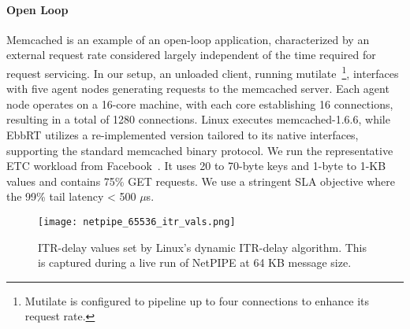 \paragraph*{Open Loop}
Memcached is an example of an open-loop application, characterized by an external request rate considered largely independent of the time required for request servicing. In our setup, an unloaded client, running mutilate~\cite{mutilate}\footnote{Mutilate is configured to pipeline up to four connections to enhance its request rate.}, interfaces with five agent nodes generating requests to the memcached server. Each agent node operates on a 16-core machine, with each core establishing 16 connections, resulting in a total of 1280 connections. Linux executes memcached-1.6.6, while EbbRT utilizes a re-implemented version tailored to its native interfaces, supporting the standard memcached binary protocol. We run the representative ETC workload from Facebook~\cite{workloadanalysisfacebook}. It uses 20 to 70-byte keys and 1-byte to 1-KB values and contains 75\% GET requests. We use a stringent SLA objective where the 99\% tail latency < 500 $\mu$s.\\


\begin{figure}[h!]
\centering
\texttt{[image: netpipe\_65536\_itr\_vals.png]}
\caption[]{\small ITR-delay values set by Linux's dynamic ITR-delay algorithm. This is captured during a live run of NetPIPE at 64 KB message size.}
\label{fig:netpipe_65536_itr_vals}
\end{figure}

